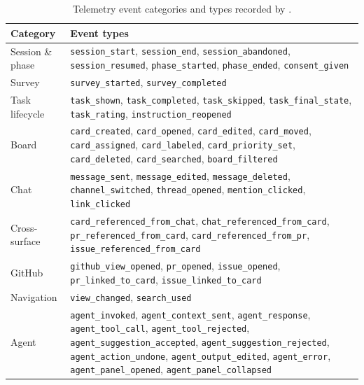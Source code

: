 \begin{table}[h]
  \caption{Telemetry event categories and types recorded by \Weld.}
  \label{tab:events}
  \small
  \begin{tabular}{lp{8.5cm}}
    \toprule
    Category & Event types \\
    \midrule
    Session \& phase
      & \texttt{session\_start}, \texttt{session\_end},
        \texttt{session\_abandoned}, \texttt{session\_resumed},
        \texttt{phase\_started}, \texttt{phase\_ended},
        \texttt{consent\_given} \\
    Survey
      & \texttt{survey\_started}, \texttt{survey\_completed} \\
    Task lifecycle
      & \texttt{task\_shown}, \texttt{task\_completed}, \texttt{task\_skipped},
        \texttt{task\_final\_state}, \texttt{task\_rating},
        \texttt{instruction\_reopened} \\
    Board
      & \texttt{card\_created}, \texttt{card\_opened}, \texttt{card\_edited},
        \texttt{card\_moved}, \texttt{card\_assigned}, \texttt{card\_labeled},
        \texttt{card\_priority\_set}, \texttt{card\_deleted},
        \texttt{card\_searched}, \texttt{board\_filtered} \\
    Chat
      & \texttt{message\_sent}, \texttt{message\_edited},
        \texttt{message\_deleted}, \texttt{channel\_switched},
        \texttt{thread\_opened}, \texttt{mention\_clicked},
        \texttt{link\_clicked} \\
    Cross-surface
      & \texttt{card\_referenced\_from\_chat},
        \texttt{chat\_referenced\_from\_card},
        \texttt{pr\_referenced\_from\_card},
        \texttt{card\_referenced\_from\_pr},
        \texttt{issue\_referenced\_from\_card} \\
    GitHub
      & \texttt{github\_view\_opened}, \texttt{pr\_opened},
        \texttt{issue\_opened}, \texttt{pr\_linked\_to\_card},
        \texttt{issue\_linked\_to\_card} \\
    Navigation
      & \texttt{view\_changed}, \texttt{search\_used} \\
    Agent
      & \texttt{agent\_invoked}, \texttt{agent\_context\_sent},
        \texttt{agent\_response}, \texttt{agent\_tool\_call},
        \texttt{agent\_tool\_rejected}, \texttt{agent\_suggestion\_accepted},
        \texttt{agent\_suggestion\_rejected}, \texttt{agent\_action\_undone},
        \texttt{agent\_output\_edited}, \texttt{agent\_error},
        \texttt{agent\_panel\_opened}, \texttt{agent\_panel\_collapsed} \\
    \bottomrule
  \end{tabular}
\end{table}
